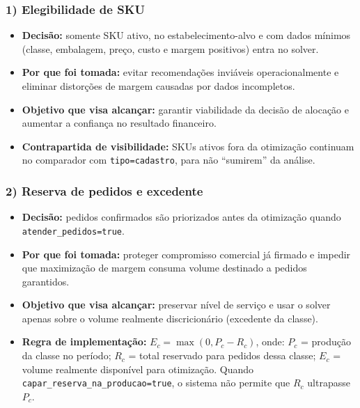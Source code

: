 \documentclass[11pt,a4paper]{article}
\begin{document}
\subsubsection*{1) Elegibilidade de SKU}
\begin{itemize}
    \item \textbf{Decisão:} somente SKU ativo, no estabelecimento-alvo e com
    dados mínimos (classe, embalagem, preço, custo e margem positivos) entra
    no solver.
    \item \textbf{Por que foi tomada:} evitar recomendações inviáveis
    operacionalmente e eliminar distorções de margem causadas por dados
    incompletos.
    \item \textbf{Objetivo que visa alcançar:} garantir viabilidade da decisão
    de alocação e aumentar a confiança no resultado financeiro.
    \item \textbf{Contrapartida de visibilidade:} SKUs ativos fora da
    otimização continuam no comparador com \texttt{tipo=cadastro}, para não
    ``sumirem'' da análise.
\end{itemize}

\subsubsection*{2) Reserva de pedidos e excedente}
\begin{itemize}
    \item \textbf{Decisão:} pedidos confirmados são priorizados antes da
    otimização quando \texttt{atender\_pedidos=true}.
    \item \textbf{Por que foi tomada:} proteger compromisso comercial já
    firmado e impedir que maximização de margem consuma volume destinado a
    pedidos garantidos.
    \item \textbf{Objetivo que visa alcançar:} preservar nível de serviço e
    usar o solver apenas sobre o volume realmente discricionário
    (excedente da classe).
    \item \textbf{Regra de implementação:}
    $E_c=\max(0,P_c-R_c)$, onde:
    $P_c$ = produção da classe no período;
    $R_c$ = total reservado para pedidos dessa classe;
    $E_c$ = volume realmente disponível para otimização.
    Quando \texttt{capar\_reserva\_na\_producao=true}, o sistema não permite
    que $R_c$ ultrapasse $P_c$.
\end{itemize}
\end{document}
